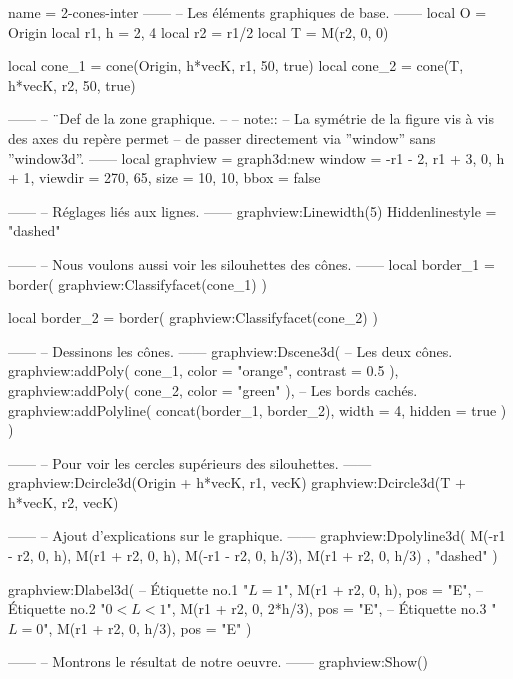 \documentclass[border = 3pt]{standalone}
\begin{document}
\begin{luadraw*}{name = 2-cones-inter}
------
-- Les éléments graphiques de base.
------
local O     = Origin
local r1, h = 2, 4
local r2    = r1/2
local T     = M(r2, 0, 0)

local cone_1 = cone(Origin, h*vecK, r1, 50, true)
local cone_2 = cone(T, h*vecK, r2, 50, true)

------
-- ¨Def de la zone graphique.
--
-- note::
--     La symétrie de la figure vis à vis des axes du repère permet
--     de passer directement via ''window'' sans ''window3d''.
------
local graphview = graph3d:new{
  window  = {-r1 - 2, r1 + 3, 0, h + 1},
  viewdir = {270, 65},
  size    = {10, 10},
  bbox = false
}

------
-- Réglages liés aux lignes.
------
graphview:Linewidth(5)
Hiddenlinestyle = "dashed"

------
-- Nous voulons aussi voir les silouhettes des cônes.
------
local border_1 = border(
  graphview:Classifyfacet(cone_1)
)

local border_2 = border(
  graphview:Classifyfacet(cone_2)
)

------
-- Dessinons les cônes.
------
graphview:Dscene3d(
-- Les deux cônes.
  graphview:addPoly(
    cone_1,
    {
      color    = "orange",
      contrast = 0.5
    }
  ),
  graphview:addPoly(
    cone_2,
    {
      color = "green"
    }
  ),
-- Les bords cachés.
  graphview:addPolyline(
    concat(border_1, border_2),
    {
      width  = 4,
      hidden = true
    }
  )
)

------
-- Pour voir les cercles supérieurs des silouhettes.
------
graphview:Dcircle3d(Origin + h*vecK, r1, vecK)
graphview:Dcircle3d(T + h*vecK, r2, vecK)

------
-- Ajout d'explications sur le graphique.
------
graphview:Dpolyline3d(
  {
    {M(-r1 - r2,  0,  h), M(r1 + r2,  0,  h)},
    {M(-r1 - r2,  0,  h/3), M(r1 + r2,  0,  h/3)}
  },
  "dashed"
)

graphview:Dlabel3d(
-- Étiquette no.1
  "$L = 1$",
  M(r1 + r2, 0, h),
  {pos = "E"},
-- Étiquette no.2
  "$0 < L <1$",
  M(r1 + r2, 0, 2*h/3),
  {pos = "E"},
-- Étiquette no.3
  "$L = 0$",
  M(r1 + r2, 0, h/3),
  {pos = "E"}
)

------
-- Montrons le résultat de notre oeuvre.
------
graphview:Show()
\end{luadraw*}
\end{document}
